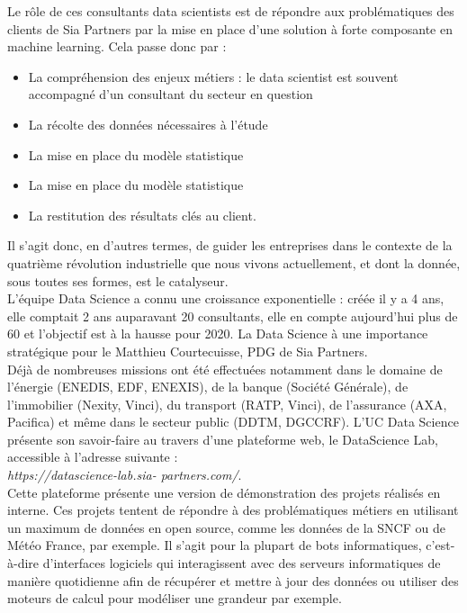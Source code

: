 \documentclass{article} %
\begin{document}
Le rôle de ces consultants data scientists est de répondre aux problématiques des clients de Sia Partners par la mise en place d’une solution à forte composante en machine learning. Cela passe donc par :
\begin{itemize}
 \item La compréhension des enjeux métiers : le data scientist est souvent accompagné d’un consultant du secteur en question
 \item  La récolte des données nécessaires à l’étude
 \item La mise en place du modèle statistique
 \item La mise en place du modèle statistique 
 \item La restitution des résultats clés au client.
\end{itemize}

Il s’agit donc, en d’autres termes, de guider les entreprises dans le contexte de la quatrième révolution industrielle que nous vivons actuellement, et dont la donnée, sous toutes ses formes, est le catalyseur.\\

L’équipe Data Science a connu une croissance exponentielle : créée il y a 4 ans, elle comptait 2 ans auparavant 20 consultants, elle en compte aujourd’hui plus de 60 et l’objectif est à la hausse pour 2020. La Data Science à une importance stratégique pour le Matthieu Courtecuisse, PDG de Sia Partners.\\

Déjà de nombreuses missions ont été effectuées notamment dans le domaine de l’énergie (ENEDIS, EDF, ENEXIS), de la banque (Société Générale), de l’immobilier (Nexity, Vinci), du transport (RATP, Vinci), de l’assurance (AXA, Pacifica) et même dans le secteur public (DDTM, DGCCRF). 
L’UC Data Science présente son savoir-faire au travers d’une plateforme web, le DataScience Lab, accessible à l’adresse suivante :\\ \textit{https://datascience-lab.sia- partners.com/}. \\

Cette plateforme présente une version de démonstration des projets réalisés en interne. Ces projets tentent de répondre à des problématiques métiers en utilisant un maximum de données en open source, comme les données de la SNCF ou de Météo France, par exemple. Il s’agit pour la plupart de bots informatiques, c’est-à-dire d’interfaces logiciels qui interagissent avec des serveurs informatiques de manière quotidienne afin de récupérer et mettre à jour des données ou utiliser des moteurs de calcul pour modéliser une grandeur par exemple. \\
\end{document}
